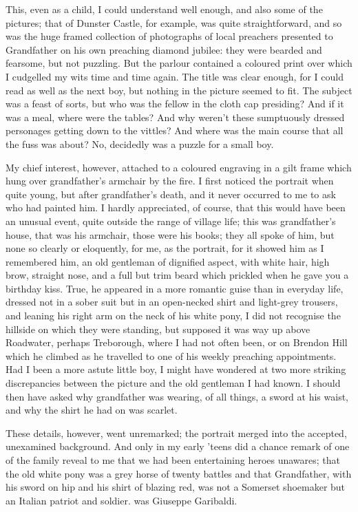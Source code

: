 This, even as a child, I could understand well enough, and also some of the pictures; that of Dunster Castle, for example, was quite straightforward, and so was the huge framed collection of photographs of local preachers presented to Grandfather on his own preaching diamond jubilee: they were bearded and fearsome, but not puzzling. But the parlour contained a coloured print over which I cudgelled my wits time and time again. The title was clear enough, for I could read as well as the next boy, but nothing in the picture seemed to fit. The subject was a feast of sorts, but who was the fellow in the cloth cap presiding? And if it was a meal, where were the tables? And why weren't these sumptuously dressed personages getting down to the vittles? And where was the main course that all the fuss was about? No, decidedly  was a puzzle for a small boy.

My chief interest, however, attached to a coloured engraving in a gilt frame which hung over grandfather’s armchair by the fire. I first noticed the portrait when quite young, but after grandfather's death, and it never occurred to me to ask who had painted him. I hardly appreciated, of course, that this would have been an unusual event, quite outside the range of village life; this was grandfather's house, that was his armchair, those were his books; they all spoke of him, but none so clearly or eloquently, for me, as the portrait, for it showed him as I remembered him, an old gentleman of dignified aspect, with white hair, high brow, straight nose, and a full but trim beard which prickled when he gave you a birthday kiss. True, he appeared in a more romantic guise than in everyday life, dressed not in a sober suit but in an open-necked shirt and light-grey trousers, and leaning his right arm on the neck of his white pony, I did not recognise the hillside on which they were standing, but supposed it was way up above Roadwater, perhaps Treborough, where I had not often been, or on Brendon Hill which he climbed as he travelled to one of his weekly preaching appointments. Had I been a more astute little boy, I might have wondered at two more striking discrepancies between the picture and the old gentleman I had known. I should then have asked why grandfather was wearing, of all things, a sword at his waist, and why the shirt he had on was scarlet.

These details, however, went unremarked; the portrait merged into the accepted, unexamined background. And only in my early 'teens did a chance remark of one of the family reveal to me that we had been entertaining heroes unawares; that the old white pony was a grey horse of twenty battles and that Grandfather, with his sword on hip and his shirt of blazing red, was not a Somerset shoemaker but an Italian patriot and soldier.  was Giuseppe Garibaldi.

